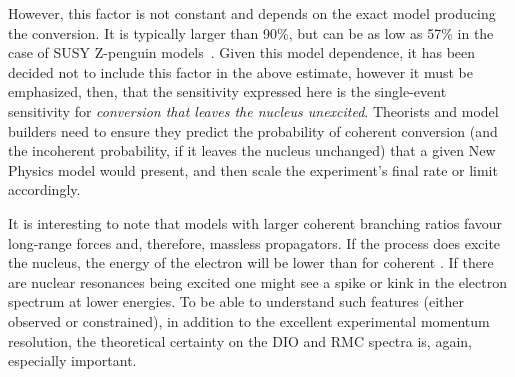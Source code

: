 However, this factor is not constant and depends on the exact model producing the conversion.  
It is typically larger than 90\%, but can be as low as 57\% in the case of SUSY Z-penguin models~\cite{Siiskonen:1999pj}.
Given this model dependence, it has been decided not to include this factor in the above estimate, however it must be emphasized, then, that the sensitivity expressed here is the single-event sensitivity for \emph{conversion that leaves the nucleus unexcited}.
Theorists and model builders need to ensure they predict the probability of coherent conversion (and the incoherent probability, if it leaves the nucleus unchanged) that a given New Physics model would present, and then scale the experiment's final rate or limit accordingly.

It is interesting to note that models with larger coherent branching ratios favour long-range forces and, therefore, massless propagators.
If the process does excite the nucleus, the energy of the electron will be lower than for coherent \mueconv.
If there are nuclear resonances being excited one might see a spike or kink in the electron spectrum at lower energies.
To be able to understand such features (either observed or constrained), in addition to the excellent experimental momentum resolution, the theoretical certainty on the \ac{DIO} and \ac{RMC} spectra is, again, especially important.
